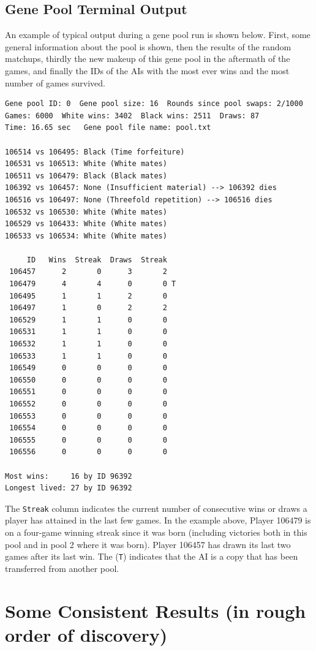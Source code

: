 \documentclass[letterpaper]{article}
\renewcommand{\_}{\allowbreak\textunderscore\allowbreak}
\begin{document}
\subsection{Gene Pool Terminal Output}
An example of typical output during a gene pool run is shown below. First, some general information about the pool is shown, then the results of the random matchups, thirdly the new makeup of this gene pool in the aftermath of the games, and finally the IDs of the AIs with the most ever wins and the most number of games survived.
\begin{verbatim}
Gene pool ID: 0  Gene pool size: 16  Rounds since pool swaps: 2/1000
Games: 6000  White wins: 3402  Black wins: 2511  Draws: 87
Time: 16.65 sec   Gene pool file name: pool.txt

106514 vs 106495: Black (Time forfeiture)
106531 vs 106513: White (White mates)
106511 vs 106479: Black (Black mates)
106392 vs 106457: None (Insufficient material) --> 106392 dies
106516 vs 106497: None (Threefold repetition) --> 106516 dies
106532 vs 106530: White (White mates)
106529 vs 106433: White (White mates)
106533 vs 106534: White (White mates)

     ID   Wins  Streak  Draws  Streak
 106457      2       0      3       2
 106479      4       4      0       0 T
 106495      1       1      2       0
 106497      1       0      2       2
 106529      1       1      0       0
 106531      1       1      0       0
 106532      1       1      0       0
 106533      1       1      0       0
 106549      0       0      0       0
 106550      0       0      0       0
 106551      0       0      0       0
 106552      0       0      0       0
 106553      0       0      0       0
 106554      0       0      0       0
 106555      0       0      0       0
 106556      0       0      0       0

Most wins:     16 by ID 96392
Longest lived: 27 by ID 96392

\end{verbatim}
The \verb|Streak| column indicates the current number of consecutive wins or draws a player has attained in the last few games. In the example above, Player 106479 is on a four-game winning streak since it was born (including victories both in this pool and in pool 2 where it was born). Player 106457 has drawn its last two games after its last win. The (\verb|T|) indicates that the AI is a copy that has been transferred from another pool.


\section{Some Consistent Results (in rough order of discovery)}
\end{document}
